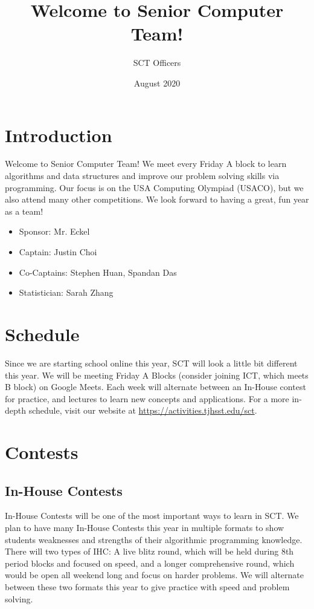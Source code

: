 \documentclass[11pt]{article}
\title{Welcome to Senior Computer Team!}
\author{SCT Officers}
\date{August 2020}
\begin{document}
\maketitle

\section{Introduction}
    Welcome to Senior Computer Team! We meet every Friday A block to learn algorithms and data structures and improve our problem solving skills via programming. Our focus is on the USA Computing Olympiad (USACO), but we also attend many other competitions. We look forward to having a great, fun year as a team! 

    
\begin{itemize}
  \item Sponsor: Mr. Eckel
  \item Captain: Justin Choi
  \item Co-Captains: Stephen Huan, Spandan Das
  \item Statistician: Sarah Zhang
\end{itemize}

\section{Schedule}
    Since we are starting school online this year, SCT will look a little bit different this year. We will be meeting Friday A Blocks (consider joining ICT, which meets B block) on Google Meets. Each week will alternate between an In-House contest for practice, and lectures to learn new concepts and applications. For a more in-depth schedule, visit our website at \url{https://activities.tjhsst.edu/sct}.
    
\section{Contests}
\subsection{In-House Contests}
       In-House Contests will be one of the most important ways to learn in SCT. We plan to have many In-House Contests this year in multiple formats to show students weaknesses and strengths of their algorithmic programming knowledge. There will two types of IHC: A live blitz round, which will be held during 8th period blocks and focused on speed, and a longer comprehensive round, which would be open all weekend long and focus on harder problems. We will alternate between these two formats this year to give practice with speed and problem solving.
\end{document}

